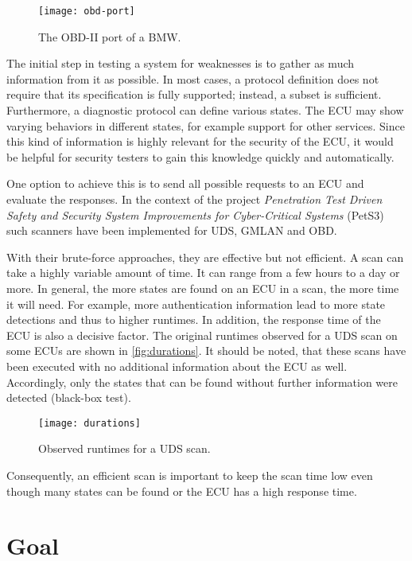\begin{figure}[htb]
    \centering
    \texttt{[image: obd-port]}
    \caption{The OBD-II port of a BMW.}
    \label{fig:obd-port}
\end{figure}

The initial step in testing a system for weaknesses is to gather as much information from it as possible. In most cases, a protocol definition does not require that its specification is fully supported; instead, a subset is sufficient.
Furthermore, a diagnostic protocol can define various states. The ECU may show varying behaviors in different states, for example support for other services. Since this kind of information is highly relevant for the security of the ECU, it would be helpful for security testers to gain this knowledge quickly and automatically.

One option to achieve this is to send all possible requests to an ECU and evaluate the responses. In the context of the project \emph{Penetration Test Driven Safety and Security System Improvements for Cyber-Critical Systems} (PetS3) \cite{pets3} such scanners have been implemented for UDS, GMLAN and OBD.

With their brute-force approaches, they are effective but not efficient. A scan can take a highly variable amount of time. It can range from a few hours to a day or more. In general, the more states are found on an ECU in a scan, the more time it will need. For example, more authentication information lead to more state detections and thus to higher runtimes. In addition, the response time of the ECU is also a decisive factor. The original runtimes observed for a UDS scan on some ECUs are shown in \autoref{fig:durations}. It should be noted, that these scans have been executed with no additional information about the ECU as well. Accordingly, only the states that can be found without further information were detected (black-box test).

\begin{figure}[htb]
    \centering
    \texttt{[image: durations]}
    \caption{Observed runtimes for a UDS scan.}
    \label{fig:durations}
\end{figure}

Consequently, an efficient scan is important to keep the scan time low even though many states can be found or the ECU has a high response time.

\section{Goal}

